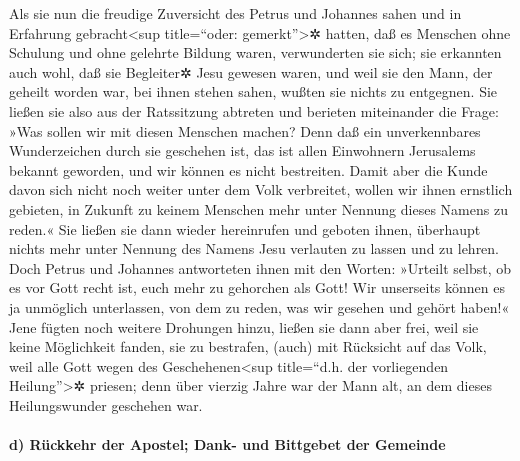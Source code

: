  Als sie nun die freudige Zuversicht des Petrus und
Johannes sahen und in Erfahrung gebracht\textless sup title=``oder:
gemerkt''\textgreater✲ hatten, daß es Menschen ohne Schulung und ohne
gelehrte Bildung waren, verwunderten sie sich; sie erkannten auch wohl,
daß sie Begleiter✲ Jesu gewesen waren,  und weil sie den
Mann, der geheilt worden war, bei ihnen stehen sahen, wußten sie nichts
zu entgegnen.  Sie ließen sie also aus der Ratssitzung
abtreten und berieten miteinander die Frage:  »Was sollen
wir mit diesen Menschen machen? Denn daß ein unverkennbares
Wunderzeichen durch sie geschehen ist, das ist allen Einwohnern
Jerusalems bekannt geworden, und wir können es nicht bestreiten.
 Damit aber die Kunde davon sich nicht noch weiter unter
dem Volk verbreitet, wollen wir ihnen ernstlich gebieten, in Zukunft zu
keinem Menschen mehr unter Nennung dieses Namens zu reden.«
 Sie ließen sie dann wieder hereinrufen und geboten
ihnen, überhaupt nichts mehr unter Nennung des Namens Jesu verlauten zu
lassen und zu lehren.  Doch Petrus und Johannes
antworteten ihnen mit den Worten: »Urteilt selbst, ob es vor Gott recht
ist, euch mehr zu gehorchen als Gott!  Wir unserseits
können es ja unmöglich unterlassen, von dem zu reden, was wir gesehen
und gehört haben!«  Jene fügten noch weitere Drohungen
hinzu, ließen sie dann aber frei, weil sie keine Möglichkeit fanden, sie
zu bestrafen, (auch) mit Rücksicht auf das Volk, weil alle Gott wegen
des Geschehenen\textless sup title=``d.h. der vorliegenden
Heilung''\textgreater✲ priesen;  denn über vierzig Jahre
war der Mann alt, an dem dieses Heilungswunder geschehen war.

\hypertarget{d-ruxfcckkehr-der-apostel-dank--und-bittgebet-der-gemeinde}{%
\paragraph{d) Rückkehr der Apostel; Dank- und Bittgebet der
Gemeinde}\label{d-ruxfcckkehr-der-apostel-dank--und-bittgebet-der-gemeinde}}

